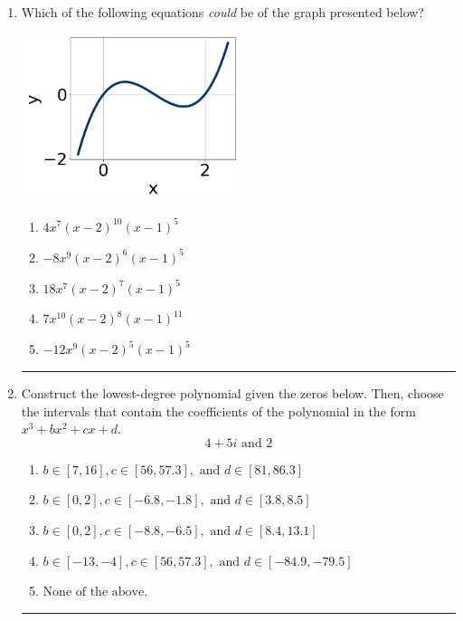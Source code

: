 \documentclass[14pt]{extbook}
\newcommand{\litem}[1]{\item#1\hspace*{-1cm}\rule{\textwidth}{0.4pt}}
\begin{document}
\begin{enumerate}
\litem{
Which of the following equations \textit{could} be of the graph presented below?
\begin{center}
    \includegraphics[width=0.5\textwidth]{../Figures/polyGraphToFunctionA.png}
\end{center}
\begin{enumerate}[label=\Alph*.]
\item \( 4x^{7} (x - 2)^{10} (x - 1)^{5} \)
\item \( -8x^{9} (x - 2)^{6} (x - 1)^{5} \)
\item \( 18x^{7} (x - 2)^{7} (x - 1)^{5} \)
\item \( 7x^{10} (x - 2)^{8} (x - 1)^{11} \)
\item \( -12x^{9} (x - 2)^{5} (x - 1)^{5} \)

\end{enumerate} }
\litem{
Construct the lowest-degree polynomial given the zeros below. Then, choose the intervals that contain the coefficients of the polynomial in the form $x^3+bx^2+cx+d$.\[ 4 + 5 i \text{ and } 2 \]\begin{enumerate}[label=\Alph*.]
\item \( b \in [7, 16], c \in [56, 57.3], \text{ and } d \in [81, 86.3] \)
\item \( b \in [0, 2], c \in [-6.8, -1.8], \text{ and } d \in [3.8, 8.5] \)
\item \( b \in [0, 2], c \in [-8.8, -6.5], \text{ and } d \in [8.4, 13.1] \)
\item \( b \in [-13, -4], c \in [56, 57.3], \text{ and } d \in [-84.9, -79.5] \)
\item \( \text{None of the above.} \)


\end{enumerate}}
\end{enumerate}
\end{document}
